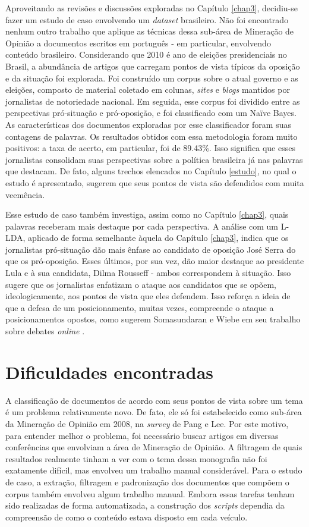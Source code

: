 Aproveitando as revisões e discussões exploradas no Capítulo \ref{chap3}, decidiu-se fazer um estudo de caso envolvendo um \emph{dataset} brasileiro. Não foi encontrado nenhum outro trabalho que aplique as técnicas dessa sub-área de Mineração de Opinião a documentos escritos em português - em particular, envolvendo conteúdo brasileiro. Considerando que 2010 é ano de eleições presidenciais no Brasil, a abundância de artigos que carregam pontos de vista típicos da oposição e da situação foi explorada. Foi construído um corpus sobre o atual governo e as eleições, composto de material coletado em colunas, \emph{sites} e \emph{blogs} mantidos por jornalistas de notoriedade nacional. Em seguida, esse corpus foi dividido entre as perspectivas pró-situação e pró-oposição, e foi classificado com um Naïve Bayes. As características dos documentos exploradas por esse classificador foram suas contagens de palavras. Os resultados obtidos com essa metodologia foram muito positivos: a taxa de acerto, em particular, foi de 89.43\%. Isso significa que esses jornalistas consolidam suas perspectivas sobre a política brasileira já nas palavras que destacam. De fato, alguns trechos elencados no Capítulo \ref{estudo}, no qual o estudo é apresentado, sugerem que seus pontos de vista são defendidos com muita veemência. 

Esse estudo de caso também investiga, assim como no Capítulo \ref{chap3}, quais palavras receberam mais destaque por cada perspectiva. A análise com um L-LDA, aplicado de forma semelhante àquela do Capítulo \ref{chap3}, indica que os jornalistas pró-situação dão mais ênfase ao candidato de oposição José Serra do que os pró-oposição. Esses últimos, por sua vez, dão maior destaque ao presidente Lula e à sua candidata, Dilma Rousseff - ambos correspondem à situação. Isso sugere que os jornalistas enfatizam o ataque aos candidatos que se opõem, ideologicamente, aos pontos de vista que eles defendem. Isso reforça a ideia de que a defesa de um posicionamento, muitas vezes, compreende o ataque a posicionamentos opostos, como sugerem Somasundaran e Wiebe em seu trabalho sobre debates \emph{online} \cite{wiebe}.  

\section{Dificuldades encontradas}

A classificação de documentos de acordo com seus pontos de vista sobre um tema é um problema relativamente novo. De fato, ele só foi estabelecido como sub-área da Mineração de Opinião em 2008, na \emph{survey} de Pang e Lee. Por este motivo, para entender melhor o problema, foi necessário buscar artigos em diversas conferências que envolviam a área de Mineração de Opinião. A filtragem de quais resultados realmente tinham a ver com o tema dessa monografia não foi exatamente difícil, mas envolveu um trabalho manual considerável. Para o estudo de caso, a extração, filtragem e padronização dos documentos que compõem o corpus também envolveu algum trabalho manual. Embora essas tarefas tenham sido realizadas de forma automatizada, a construção dos \emph{scripts} dependia da compreensão de como o conteúdo estava disposto em cada veículo.  


